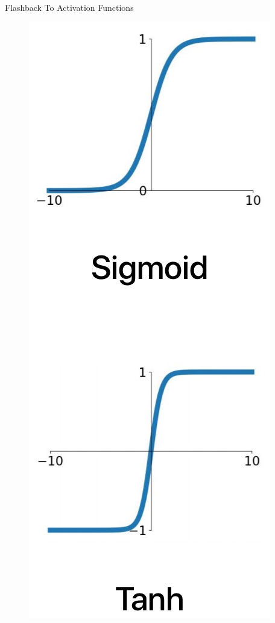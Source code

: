 \documentclass[serif, aspectratio=169]{beamer}
\begin{document}
\begin{frame}{Flashback To Activation Functions}
\begin{textblock*}{5cm}
\begin{figure}[htbp]
\begin{center}
			\includegraphics[keepaspectratio, scale=0.18]{pic/sigmoid_tanh}
		\end{center}
	\end{figure}
	\end{textblock*}
	
\end{frame}
\end{document}
